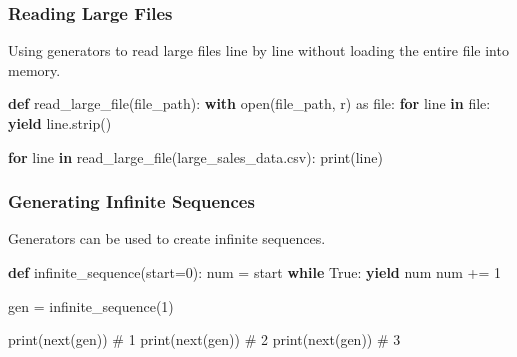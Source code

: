 \documentclass[
  letterpaper,
  DIV=11,
  numbers=noendperiod]{scrreprt}
\newenvironment{Shaded}{\begin{snugshade}}{\end{snugshade}}
\newcommand{\BuiltInTok}[1]{\textcolor[rgb]{0.00,0.23,0.31}{#1}}
\newcommand{\CommentTok}[1]{\textcolor[rgb]{0.37,0.37,0.37}{#1}}
\newcommand{\ControlFlowTok}[1]{\textcolor[rgb]{0.00,0.23,0.31}{\textbf{#1}}}
\newcommand{\DecValTok}[1]{\textcolor[rgb]{0.68,0.00,0.00}{#1}}
\newcommand{\ImportTok}[1]{\textcolor[rgb]{0.00,0.46,0.62}{#1}}
\newcommand{\KeywordTok}[1]{\textcolor[rgb]{0.00,0.23,0.31}{\textbf{#1}}}
\newcommand{\NormalTok}[1]{\textcolor[rgb]{0.00,0.23,0.31}{#1}}
\newcommand{\OperatorTok}[1]{\textcolor[rgb]{0.37,0.37,0.37}{#1}}
\newcommand{\StringTok}[1]{\textcolor[rgb]{0.13,0.47,0.30}{#1}}
\newcommand{\VariableTok}[1]{\textcolor[rgb]{0.07,0.07,0.07}{#1}}
\begin{document}
\subsubsection{Reading Large Files}\label{reading-large-files}

Using generators to read large files line by line without loading the
entire file into memory.

\begin{Shaded}
\begin{Highlighting}[]
\KeywordTok{def}\NormalTok{ read\_large\_file(file\_path):}
    \ControlFlowTok{with} \BuiltInTok{open}\NormalTok{(file\_path, }\StringTok{\textquotesingle{}r\textquotesingle{}}\NormalTok{) }\ImportTok{as} \BuiltInTok{file}\NormalTok{:}
        \ControlFlowTok{for}\NormalTok{ line }\KeywordTok{in} \BuiltInTok{file}\NormalTok{:}
            \ControlFlowTok{yield}\NormalTok{ line.strip()}

\ControlFlowTok{for}\NormalTok{ line }\KeywordTok{in}\NormalTok{ read\_large\_file(}\StringTok{\textquotesingle{}large\_sales\_data.csv\textquotesingle{}}\NormalTok{):}
    \BuiltInTok{print}\NormalTok{(line)}
\end{Highlighting}
\end{Shaded}

\subsubsection{Generating Infinite
Sequences}\label{generating-infinite-sequences}

Generators can be used to create infinite sequences.

\begin{Shaded}
\begin{Highlighting}[]
\KeywordTok{def}\NormalTok{ infinite\_sequence(start}\OperatorTok{=}\DecValTok{0}\NormalTok{):}
\NormalTok{    num }\OperatorTok{=}\NormalTok{ start}
    \ControlFlowTok{while} \VariableTok{True}\NormalTok{:}
        \ControlFlowTok{yield}\NormalTok{ num}
\NormalTok{        num }\OperatorTok{+=} \DecValTok{1}

\NormalTok{gen }\OperatorTok{=}\NormalTok{ infinite\_sequence(}\DecValTok{1}\NormalTok{)}

\BuiltInTok{print}\NormalTok{(}\BuiltInTok{next}\NormalTok{(gen))  }\CommentTok{\# 1}
\BuiltInTok{print}\NormalTok{(}\BuiltInTok{next}\NormalTok{(gen))  }\CommentTok{\# 2}
\BuiltInTok{print}\NormalTok{(}\BuiltInTok{next}\NormalTok{(gen))  }\CommentTok{\# 3}
\end{Highlighting}
\end{Shaded}
\end{document}
